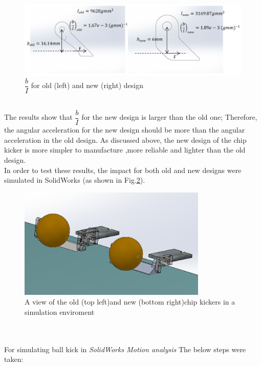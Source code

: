 \begin{figure}
	\centering
	\includegraphics[width=1.0\textwidth]{images/SIDE_VIEW_CHIP.png}
	\caption{$\dfrac{b}{I}$ for old (left) and new (right) design}
	\label{fig:CHIP_SIDE_VIEW}
\end{figure}\\
The results show that $\dfrac{b}{I}$ for the new design is larger than the old one; Therefore, the angular acceleration for the new design should be more than the angular acceleration in the old design. As discussed above, the new design of the chip kicker is more simpler to manufacture ,more reliable and lighter than the old design. %
\\
\indent In order to test these results, the impact for both old and new designs were simulated in SolidWorks (as shown in Fig.\ref{fig:SIM2CHIP}).\\
\begin{figure}
	\centering
	\includegraphics[width=0.8\textwidth]{images/SIM_CHIPx2.png}
	\caption{A view of the old (top left)and new (bottom right)chip kickers in a simulation enviroment}
	\label{fig:SIM2CHIP}
\end{figure}\\
\\
For simulating ball kick in \textit{SolidWorks Motion analysis} The below steps were taken:
